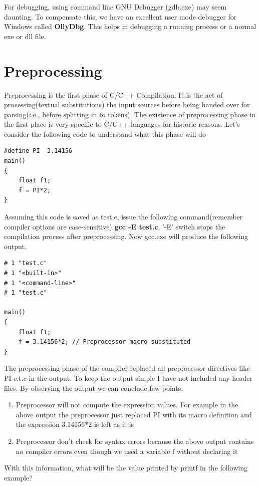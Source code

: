 \documentclass{article}
\begin{document}
For debugging, using command line GNU Debugger (gdb.exe) may seem daunting. To compensate this, we have an excellent user mode debugger for Windows called \textbf{OllyDbg}. This helps in debugging a running process or a normal exe or dll file.
\section{Preprocessing}
Preprocessing is the first phase of C/C++ Compilation. It is the act of processing(textual substitutions) the input sources before being handed over for parsing(i.e., before splitting in to tokens). The existence of preprocessing phase in the first place is very specific to C/C++ languages for historic reasons. Let's consider the following code to understand what this phase will do
\begin{verbatim}
#define PI  3.14156
main()
{
    float f1;
    f = PI*2;
}
\end{verbatim}

Assuming this code is saved as test.c, issue the following command(remember compiler options are case-sensitive) {\textbf{gcc -E test.c}}. '-E' switch stops the compilation process after preprocessing. Now gcc.exe will produce the following output.
\begin{verbatim}
# 1 "test.c"
# 1 "<built-in>"
# 1 "<command-line>"
# 1 "test.c"

main()
{
    float f1;
    f = 3.14156*2; // Preprocessor macro substituted
}
\end{verbatim}

The preprocessing phase of the compiler replaced all preprocessor directives like PI e.t.c in the output. To keep the output simple I have not included any header files. By observing the output we can conclude few points.

\begin{enumerate}[noitemsep]
    \item Preprocessor will not compute the expression values. For example in the above output the preprocessor just replaced PI with its macro definition and the expression 3.14156*2 is left as it is
    \item Preprocessor don't check for syntax errors because the above output contains no compiler errors even though we used a variable f without declaring it
\end{enumerate}

With this information, what will be the value printed by printf in the following example?
\end{document}
